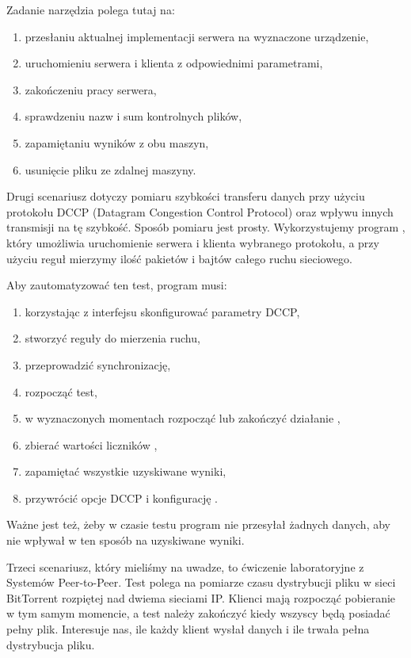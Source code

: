 \documentclass[00-praca-magisterska.tex]{subfiles}
\begin{document}
Zadanie narzędzia polega tutaj na:
\begin{enumerate}
\item przesłaniu aktualnej implementacji serwera na wyznaczone urządzenie,
\item uruchomieniu serwera i klienta z odpowiednimi parametrami,
\item zakończeniu pracy serwera,
\item sprawdzeniu nazw i sum kontrolnych plików,
\item zapamiętaniu wyników z obu maszyn,
\item usunięcie pliku ze zdalnej maszyny.
\end{enumerate}

Drugi scenariusz dotyczy pomiaru szybkości transferu danych przy użyciu
protokołu DCCP (Datagram Congestion Control Protocol) oraz wpływu innych
transmisji na tę szybkość. Sposób pomiaru jest prosty. Wykorzystujemy program
, który umożliwia uruchomienie serwera i klienta wybranego
protokołu, a przy użyciu reguł  mierzymy ilość pakietów i bajtów
całego ruchu sieciowego.

Aby zautomatyzować ten test, program musi:
\begin{enumerate}
\item korzystając z interfejsu  skonfigurować parametry DCCP,
\item stworzyć reguły  do mierzenia ruchu,
\item przeprowadzić synchronizację, 
\item rozpocząć test,
\item w wyznaczonych momentach rozpocząć lub zakończyć działanie ,
\item zbierać wartości liczników ,
\item zapamiętać wszystkie uzyskiwane wyniki,
\item przywrócić opcje DCCP i konfigurację .
\end{enumerate}

Ważne jest też, żeby w czasie testu program nie przesyłał żadnych danych, aby
nie wpływał w ten sposób na uzyskiwane wyniki.

Trzeci scenariusz, który mieliśmy na uwadze, to ćwiczenie laboratoryjne z
Systemów Peer-to-Peer. Test polega na pomiarze czasu dystrybucji pliku w sieci
BitTorrent rozpiętej nad dwiema sieciami IP. Klienci mają rozpocząć pobieranie
w tym samym momencie, a test należy zakończyć kiedy wszyscy będą posiadać pełny
plik. Interesuje nas, ile każdy klient wysłał danych i ile trwała pełna
dystrybucja pliku.
\end{document}
